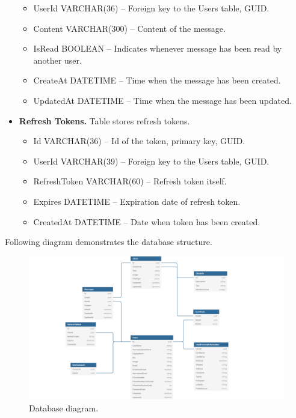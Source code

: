\begin{itemize}
\begin{itemize}
        \item UserId VARCHAR(36) -- Foreign key to the Users table, GUID\@.
        \item Content VARCHAR(300) -- Content of the message.
        \item IsRead BOOLEAN -- Indicates whenever message has been read by another user.
        \item CreateAt DATETIME -- Time when the message has been created.
        \item UpdatedAt DATETIME -- Time when the message has been updated.
    \end{itemize}
    \item \textbf{Refresh Tokens.} Table stores refresh tokens.
    \begin{itemize}
        \item Id VARCHAR(36) -- Id of the token, primary key, GUID\@.
        \item UserId VARCHAR(39) -- Foreign key to the Users table, GUID\@.
        \item RefreshToken VARCHAR(60) -- Refresh token itself.
        \item Expires DATETIME -- Expiration date of refresh token.
        \item CreatedAt DATETIME -- Date when token has been created.
    \end{itemize}
\end{itemize}
Following diagram demonstrates the database structure.
\begin{figure}[H]
    \centering
    \includegraphics[width=1.2\textwidth]{Pictures/DB_diagram}
    \caption{Database diagram.}\label{fig:figure5}
\end{figure}